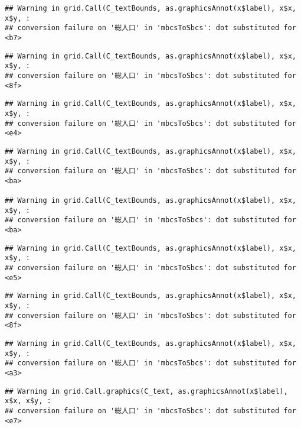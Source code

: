 \documentclass[
]{article}
\begin{document}
\begin{verbatim}
## Warning in grid.Call(C_textBounds, as.graphicsAnnot(x$label), x$x, x$y, :
## conversion failure on '総人口' in 'mbcsToSbcs': dot substituted for <b7>
\end{verbatim}

\begin{verbatim}
## Warning in grid.Call(C_textBounds, as.graphicsAnnot(x$label), x$x, x$y, :
## conversion failure on '総人口' in 'mbcsToSbcs': dot substituted for <8f>
\end{verbatim}

\begin{verbatim}
## Warning in grid.Call(C_textBounds, as.graphicsAnnot(x$label), x$x, x$y, :
## conversion failure on '総人口' in 'mbcsToSbcs': dot substituted for <e4>
\end{verbatim}

\begin{verbatim}
## Warning in grid.Call(C_textBounds, as.graphicsAnnot(x$label), x$x, x$y, :
## conversion failure on '総人口' in 'mbcsToSbcs': dot substituted for <ba>

## Warning in grid.Call(C_textBounds, as.graphicsAnnot(x$label), x$x, x$y, :
## conversion failure on '総人口' in 'mbcsToSbcs': dot substituted for <ba>
\end{verbatim}

\begin{verbatim}
## Warning in grid.Call(C_textBounds, as.graphicsAnnot(x$label), x$x, x$y, :
## conversion failure on '総人口' in 'mbcsToSbcs': dot substituted for <e5>
\end{verbatim}

\begin{verbatim}
## Warning in grid.Call(C_textBounds, as.graphicsAnnot(x$label), x$x, x$y, :
## conversion failure on '総人口' in 'mbcsToSbcs': dot substituted for <8f>
\end{verbatim}

\begin{verbatim}
## Warning in grid.Call(C_textBounds, as.graphicsAnnot(x$label), x$x, x$y, :
## conversion failure on '総人口' in 'mbcsToSbcs': dot substituted for <a3>
\end{verbatim}

\begin{verbatim}
## Warning in grid.Call.graphics(C_text, as.graphicsAnnot(x$label), x$x, x$y, :
## conversion failure on '総人口' in 'mbcsToSbcs': dot substituted for <e7>
\end{verbatim}
\end{document}

